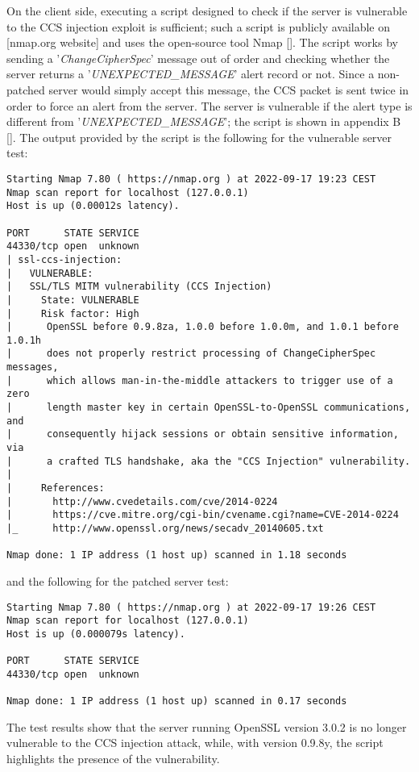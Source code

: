 On the client side, executing a script designed to check if the server is vulnerable to the CCS injection exploit is sufficient; such a script is publicly available on [nmap.org website] and uses the open-source tool Nmap []. The script works by sending a '\textit{ChangeCipherSpec}' message out of order and checking whether the server returns a '\textit{UNEXPECTED\_MESSAGE}' alert record or not. Since a non-patched server would simply accept this message, the CCS packet is sent twice in order to force an alert from the server. The server is vulnerable if the alert type is different from '\textit{UNEXPECTED\_MESSAGE}'; the script is shown in appendix B []. The output provided by the script is the following for the vulnerable server test:  

\begin{verbatim}
Starting Nmap 7.80 ( https://nmap.org ) at 2022-09-17 19:23 CEST
Nmap scan report for localhost (127.0.0.1)
Host is up (0.00012s latency).

PORT      STATE SERVICE
44330/tcp open  unknown
| ssl-ccs-injection: 
|   VULNERABLE:
|   SSL/TLS MITM vulnerability (CCS Injection)
|     State: VULNERABLE
|     Risk factor: High
|      OpenSSL before 0.9.8za, 1.0.0 before 1.0.0m, and 1.0.1 before 1.0.1h
|      does not properly restrict processing of ChangeCipherSpec messages,
|      which allows man-in-the-middle attackers to trigger use of a zero
|      length master key in certain OpenSSL-to-OpenSSL communications, and
|      consequently hijack sessions or obtain sensitive information, via
|      a crafted TLS handshake, aka the "CCS Injection" vulnerability.
|           
|     References:
|       http://www.cvedetails.com/cve/2014-0224
|       https://cve.mitre.org/cgi-bin/cvename.cgi?name=CVE-2014-0224
|_      http://www.openssl.org/news/secadv_20140605.txt

Nmap done: 1 IP address (1 host up) scanned in 1.18 seconds
\end{verbatim}

and the following for the patched server test:
\begin{verbatim}
Starting Nmap 7.80 ( https://nmap.org ) at 2022-09-17 19:26 CEST
Nmap scan report for localhost (127.0.0.1)
Host is up (0.000079s latency).

PORT      STATE SERVICE
44330/tcp open  unknown

Nmap done: 1 IP address (1 host up) scanned in 0.17 seconds
\end{verbatim}

The test results show that the server running OpenSSL version 3.0.2 is no longer vulnerable to the CCS injection attack, while, with version 0.9.8y, the script highlights the presence of the vulnerability.



